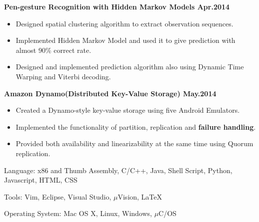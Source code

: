 \documentclass{myres}
\begin{document}
{	\textbf{Pen-gesture Recognition with Hidden Markov Models \hfill Apr.2014}
	\begin{itemize}[topsep=0pt, leftmargin=0.2in] \itemsep -5pt
			\item Designed spatial clustering algorithm to extract observation sequences.
			\item Implemented Hidden Markov Model and used it to give prediction with almost 90\% correct rate.
			\item Designed and implemented prediction algorithm also using Dynamic Time Warping and Viterbi decoding. 
	\end{itemize}	

	\par
	\smallskip

	\textbf{Amazon Dynamo(Distributed Key-Value Storage) \hfill May.2014}
	\begin{itemize}[topsep=0pt, leftmargin=0.2in] \itemsep -5pt
			\item Created a Dynamo-style key-value storage using five Android Emulators.
			\item Implemented the functionality of partition, replication and \textbf{failure handling}.
			\item Provided both availability and linearizability at the same time using Quorum replication. 
	\end{itemize}
}
{
	Language: x86 and Thumb Assembly, C/C++, Java, Shell Script, Python, Javascript, HTML, CSS
	\par
	Tools: Vim, Eclipse, Visual Studio, $\mu$Vision, \LaTeX
	\par
	Operating System: Mac OS X, Linux, Windows, $\mu$C/OS
}
%
\end{document}
